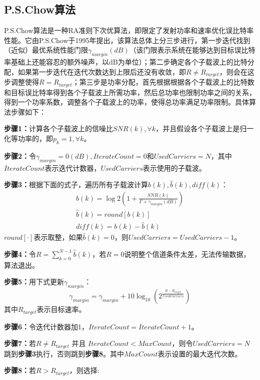 \subsection{P.S.Chow算法}
P.S.Chow算法\cite{chow1995practical}是一种RA准则下次优算法，即限定了发射功率和速率优化误比特率性能。它由P.S.Chow于1995年提出，该算法总体上分三步进行，第一步迭代找到（近似）最优系统性能门限$\gamma_{margin}(dB)$（该门限表示系统在能够达到目标误比特率基础上还能容忍的额外噪声，以dB为单位）；第二步确定各个子载波上的比特分配，如果第一步迭代在迭代次数达到上限后还没有收敛，即$R\neq R_{target}$，则会在这步调整使得$R=R_{target}$；第三步是功率分配，首先根据根据各个子载波上的比特数和目标误比特率得到各个子载波上所需功率，然后总功率也限制功率之间的关系，得到一个功率系数，调整各个子载波上的功率，使得总功率满足功率限制。具体算法步骤如下：
\begin{description}
\item{\bf{步骤1：}}计算各个子载波上的信噪比$SNR(k),\forall k$，并且假设各个子载波上是归一化等功率的，即$p_k=1, \forall k$。
\item{\bf{步骤2：}}令$\gamma_{margin}=0 (dB), IterateCount =0$和$UsedCarriers=N$，其中$IterateCount$表示迭代计数器，$UsedCarriers$表示使用的子载波。
\item{\bf{步骤3：}}根据下面的式子，遍历所有子载波计算$b(k),\hat{b}(k),diff(k)$：
\begin{eqnarray}
b(k)=\log2(1+\frac{SNR(k)}{\Gamma+\gamma_{margin}(dB)})\\
\hat{b}(k)=round[b(k)]\\
diff(k)=b(k)-\hat{b}(k)
\end{eqnarray}
$round[\cdot]$表示取整，如果$\hat{b}(k)=0$，则$UsedCarriers=UsedCarriers-1$。
\item{\bf{步骤4：}}令$R=\sum_{k=0}^{N-1}\hat{b}(k)$，若$R=0$说明整个信道条件太差，无法传输数据，算法退出。
\item{\bf{步骤5：}}用下式更新$\gamma_{margin}$：
\begin{equation}
\gamma_{margin}=\gamma_{margin}+10\log_{10}(2^{\frac{R-R_{target}}{UsedCarriers}})
\end{equation}
其中$R_{target}$表示目标速率。
\item{\bf{步骤6：}}令迭代计数器加1，$IterateCount=IterateCount+1$。
\item{\bf{步骤7：}}若$R\neq R_{target}$ 并且 $IterateCount<MaxCount$，则令$UsedCarriers=N$跳到\textbf{步骤3}执行，否则跳到\textbf{步骤8}。其中$MaxCount$表示设置的最大迭代次数。
\item{\bf{步骤8：}}若$R>R_{target}$，则选择:
\begin{equation}

\end{equation}
\end{description}
